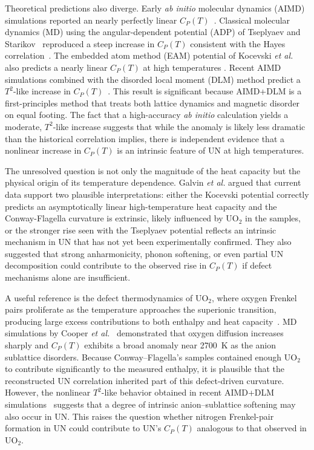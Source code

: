 \documentclass[
preprint, linenumbers,
amsmath, amssymb, aps, physrev,
]{revtex4-2}
\newcommand{\?}{\stackrel{?}{=}}
\begin{document}
Theoretical predictions also diverge. Early \textit{ab initio} molecular dynamics (AIMD) simulations reported an nearly perfectly linear $C_{P}(T)$~\cite{Kocevski2023}. Classical molecular dynamics (MD) using the angular-dependent potential (ADP) of Tseplyaev and Starikov~\cite{Kuksin2016,Tseplyaev2016} reproduced a steep increase in $C_P(T)$ consistent with the Hayes correlation~\cite{AbdulHameed2024}. The embedded atom method (EAM) potential of Kocevski \textit{et al.}~\cite{Kocevski2022II} also predicts a nearly linear $C_P(T)$ at high temperatures \cite{AbdulHameed2024}. Recent AIMD simulations combined with the disorded local moment (DLM) method predict a $T^{2}$-like increase in $C_P(T)$~\cite{AbdulHameed2025}. This result is significant because AIMD+DLM is a first-principles method that treats both lattice dynamics and magnetic disorder on equal footing. The fact that a high-accuracy \textit{ab initio} calculation yields a moderate, $T^{2}$-like increase suggests that while the anomaly is likely less dramatic than the historical correlation implies, there is independent evidence that a nonlinear increase in $C_{P}(T)$ is an intrinsic feature of UN at high temperatures.

The unresolved question is not only the magnitude of the heat capacity but the physical origin of its temperature dependence. Galvin \textit{et al.} \cite{Galvin2023} argued that current data support two plausible interpretations: either the Kocevski potential correctly predicts an asymptotically linear high-temperature heat capacity and the Conway-Flagella curvature is extrinsic, likely influenced by UO$_2$ in the samples, or the stronger rise seen with the Tseplyaev potential reflects an intrinsic mechanism in UN that has not yet been experimentally confirmed. They also suggested that strong anharmonicity, phonon softening, or even partial UN decomposition could contribute to the observed rise in $C_P(T)$ if defect mechanisms alone are insufficient.

A useful reference is the defect thermodynamics of UO$_2$, where oxygen Frenkel pairs proliferate as the temperature approaches the superionic transition, producing large excess contributions to both enthalpy and heat capacity~\cite{Pavlov2017}. MD simulations by Cooper \textit{et al.}~\cite{Cooper2014} demonstrated that oxygen diffusion increases sharply and $C_{P}(T)$ exhibits a broad anomaly near 2700~K as the anion sublattice disorders. Because Conway–Flagella's samples contained enough UO$_2$ to contribute significantly to the measured enthalpy, it is plausible that the reconstructed UN correlation inherited part of this defect-driven curvature. However, the nonlinear $T^{2}$-like behavior obtained in recent AIMD+DLM simulations~\cite{AbdulHameed2025} suggests that a degree of intrinsic anion–sublattice softening may also occur in UN. This raises the question whether nitrogen Frenkel-pair formation in UN could contribute to UN's $C_P(T)$ analogous to that observed in UO$_2$.
\end{document}
